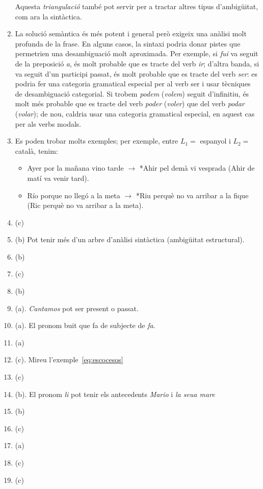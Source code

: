 \begin{enumerate}
      Aquesta \emph{triangulació} també pot servir per a tractar altres tipus
      d'ambigüitat, com ara la sintàctica.

      
    \item La solució semàntica és més potent i general però exigeix
      una anàlisi molt profunda de la frase. En alguns casos, la
      sintaxi podria donar pistes que permetrien una desambiguació
      molt aproximada. Per exemple, si {\em fui\/} va seguit de la
      preposició {\em a}, és molt probable que es tracte del verb {\em
        ir}; d'altra banda, si va seguit d'un participi passat, és
      molt probable que es tracte del verb {\em ser\/}: es podria fer
      una categoria gramatical especial per al verb ser i usar
      tècniques de desambiguació categorial. Si trobem {\em podem\/}
      ({\em volem\/}) seguit d'infinitiu, és molt més probable que es
      tracte del verb {\em poder\/} ({\em voler\/}) que del verb {\em
        podar} ({\em volar\/}); de nou, caldria usar una categoria
      gramatical especial, en aquest cas per als verbs modals.
     
    \item Es poden trobar molts exemples; per exemple, 
     entre $L_1 =$ espanyol i $L_2 =$ català, tenim:
    \begin{itemize}
    \item Ayer por la mañana vino tarde $\rightarrow$ *Ahir pel demà vi
      vesprada (Ahir de matí va venir tard).
    \item Río porque no llegó a la meta $\rightarrow$ *Riu perquè no
      va arribar a la fique (Ric perquè no va arribar a la meta).
    \end{itemize}
      
\item (c)
\item (b) Pot tenir més d'un arbre d'anàlisi sintàctica (ambigüitat
  estructural).
\item (b) 
\item (c)
\item (b)
\item (a). \emph{Cantamos} pot ser present o passat.
\item (a). El pronom buit que fa de subjecte de \emph{fa}.
\item (a)
\item (c). Mireu l'exemple~\ref{eq:escocesos}
\item (c)
\item (b). El pronom \emph{li} pot tenir els antecedents \emph{Mario}
  i \emph{la seua mare}
\item (b)
\item (c)
\item (a)
\item (c)
\item (c)


\end{enumerate}

